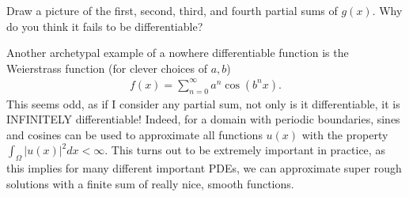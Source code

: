 \documentclass{ximera}
\begin{document}
\begin{exercise}
    Draw a picture of the first, second, third, and fourth partial sums of $g(x)$.  Why do you think it fails to be differentiable?
\end{exercise}

Another archetypal example of a nowhere differentiable function is the Weierstrass function (for clever choices of $a,b$)
\begin{align*}
    f(x) = \sum\limits_{n=0}^\infty a^n\cos(b^nx).
\end{align*}
This seems odd, as if I consider any partial sum, not only is it differentiable, it is INFINITELY differentiable!  Indeed, for a domain with periodic boundaries, sines and cosines can be used to approximate all functions $u(x)$ with the property $\int_\Omega |u(x)|^2 dx < \infty$.  This turns out to be extremely important in practice, as this implies for many different important PDEs, we can approximate super rough solutions with a finite sum of really nice, smooth functions.
\end{document}

